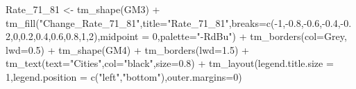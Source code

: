 \documentclass[
]{article}
\newenvironment{Shaded}{\begin{snugshade}}{\end{snugshade}}
\newcommand{\AttributeTok}[1]{\textcolor[rgb]{0.77,0.63,0.00}{#1}}
\newcommand{\DecValTok}[1]{\textcolor[rgb]{0.00,0.00,0.81}{#1}}
\newcommand{\FloatTok}[1]{\textcolor[rgb]{0.00,0.00,0.81}{#1}}
\newcommand{\FunctionTok}[1]{\textcolor[rgb]{0.00,0.00,0.00}{#1}}
\newcommand{\NormalTok}[1]{#1}
\newcommand{\OtherTok}[1]{\textcolor[rgb]{0.56,0.35,0.01}{#1}}
\newcommand{\SpecialCharTok}[1]{\textcolor[rgb]{0.00,0.00,0.00}{#1}}
\newcommand{\StringTok}[1]{\textcolor[rgb]{0.31,0.60,0.02}{#1}}
\begin{document}
\begin{Shaded}
\begin{Highlighting}[]
\NormalTok{Rate\_71\_81 }\OtherTok{\textless{}{-}} \FunctionTok{tm\_shape}\NormalTok{(GM3) }\SpecialCharTok{+}
  \FunctionTok{tm\_fill}\NormalTok{(}\StringTok{"Change\_Rate\_71\_81"}\NormalTok{,}\AttributeTok{title=}\StringTok{"Rate\_71\_81"}\NormalTok{,}\AttributeTok{breaks=}\FunctionTok{c}\NormalTok{(}\SpecialCharTok{{-}}\DecValTok{1}\NormalTok{,}\SpecialCharTok{{-}}\FloatTok{0.8}\NormalTok{,}\SpecialCharTok{{-}}\FloatTok{0.6}\NormalTok{,}\SpecialCharTok{{-}}\FloatTok{0.4}\NormalTok{,}\SpecialCharTok{{-}}\FloatTok{0.2}\NormalTok{,}\DecValTok{0}\NormalTok{,}\FloatTok{0.2}\NormalTok{,}\FloatTok{0.4}\NormalTok{,}\FloatTok{0.6}\NormalTok{,}\FloatTok{0.8}\NormalTok{,}\DecValTok{1}\NormalTok{,}\DecValTok{2}\NormalTok{),}\AttributeTok{midpoint =} \DecValTok{0}\NormalTok{,}\AttributeTok{palette=}\StringTok{"{-}RdBu"}\NormalTok{)  }\SpecialCharTok{+}
  \FunctionTok{tm\_borders}\NormalTok{(}\AttributeTok{col=}\StringTok{\textquotesingle{}Grey\textquotesingle{}}\NormalTok{, }\AttributeTok{lwd=}\FloatTok{0.5}\NormalTok{) }\SpecialCharTok{+}
\FunctionTok{tm\_shape}\NormalTok{(GM4) }\SpecialCharTok{+}
  \FunctionTok{tm\_borders}\NormalTok{(}\AttributeTok{lwd=}\FloatTok{1.5}\NormalTok{) }\SpecialCharTok{+}
  \FunctionTok{tm\_text}\NormalTok{(}\AttributeTok{text=}\StringTok{"Cities"}\NormalTok{,}\AttributeTok{col=}\StringTok{"black"}\NormalTok{,}\AttributeTok{size=}\FloatTok{0.8}\NormalTok{) }\SpecialCharTok{+}
\FunctionTok{tm\_layout}\NormalTok{(}\AttributeTok{legend.title.size =} \DecValTok{1}\NormalTok{,}\AttributeTok{legend.position =} \FunctionTok{c}\NormalTok{(}\StringTok{"left"}\NormalTok{,}\StringTok{"bottom"}\NormalTok{),}\AttributeTok{outer.margins=}\DecValTok{0}\NormalTok{)}


\end{Highlighting}
\end{Shaded}
\end{document}
